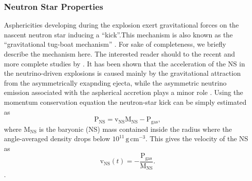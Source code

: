 \documentclass[fleqn,usenatbib]{mnras}
\newcommand{\gcc}{\text{g}\, \text{cm}^{-3}}
\begin{document}
\subsubsection{Neutron Star Properties}
\label{sec:Neutron Star Properties}
Asphericities developing during the explosion exert gravitational forces on the nascent neutron star inducing a ``kick''.This mechanism is also known as the ``gravitational tug-boat mechanism'' \citep{Wongwathanarat2013}. For sake of completeness, we briefly describe the mechanism here. The interested reader should to the recent and more complete studies by \citet{Scheck2006,Wongwathanarat2013,Janka2017,Gessner2018,Mueller2019}. It has been shown that the acceleration of the NS in the neutrino-driven explosions is caused mainly by the gravitational attraction from the asymmetrically exapnding ejecta, while the asymmetric neutrino emission associated with the aspherical accretion plays a minor role  \cite{Janka2017}. Using the momentum conservation equation the neutron-star kick can be simply estimated as
\begin{equation}
  \pmb{\mathrm{P}}_{\mathrm{NS}} = \pmb{\mathrm{v}}_{\mathrm{NS}}\mathrm{M_{NS}} -\pmb{\mathrm{P}}_{\mathrm{gas}},
\end{equation}
where $\mathrm{M_{NS}}$ is the baryonic (NS) mass contained inside the radius where the angle-averaged density drops below $10^{11}\, \gcc$. This gives the velocity of the NS as
\begin{equation}
  \pmb{\mathrm{v}}_{\mathrm{NS}}(t) = - \frac{\pmb{\mathrm{P}}_{\mathrm{gas}}}{ \mathrm{M_{NS}}}.
  \label{equ:momentum_kick}
\end{equation}.
\end{document}
